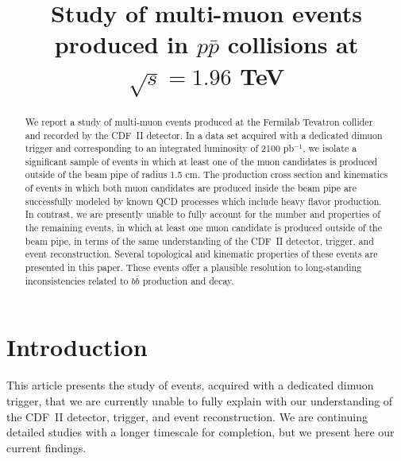 \documentclass[aps,prd,preprint,floatfix,nofootinbib,superscriptaddress,showpacs,amssymb]{revtex4}
\begin{document}

 

 \title {
 Study of multi-muon events produced in {\boldmath $p\bar{p}$}
 collisions  at {\boldmath $\sqrt{s}=1.96$} TeV 
}

\noaffiliation
 \begin{abstract}
 We report a study of multi-muon events produced at the
 Fermilab Tevatron collider and recorded by the CDF~II detector. In a data 
 set acquired with a dedicated dimuon trigger and corresponding to an 
 integrated luminosity of 2100 pb$^{-1}$, we isolate a significant sample of 
 events in which at least one of the muon candidates is produced 
 outside of the beam pipe of radius 1.5 cm. The production cross section
 and kinematics of events in which both muon candidates are produced inside
 the beam pipe are successfully modeled by known QCD processes which
 include heavy flavor production. In contrast, we are presently unable to 
 fully account for the number and properties of the remaining events, in which
 at least one muon candidate is produced outside of the beam pipe, in terms
 of the same understanding of the CDF~II detector, trigger, and event 
 reconstruction. Several topological and kinematic properties of these 
 events are presented in this paper. These events offer a plausible 
 resolution to long-standing inconsistencies related to $b\bar{b}$
 production and decay.     
 \end{abstract} 
 \maketitle
 \section {Introduction}  \label{sec:ss-intro}
 This article presents the study of events, acquired with a dedicated
 dimuon trigger, that we are currently unable to fully explain with our
 understanding of the CDF~II detector, trigger, and event reconstruction.
 We are continuing detailed studies with a longer timescale for completion,
 but we present here our current findings.
 
\end{document}
